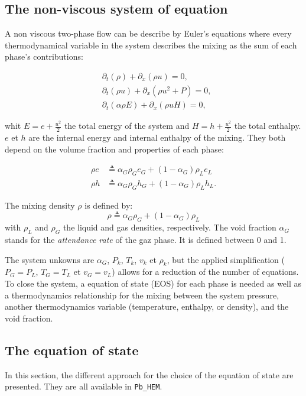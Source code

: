 \subsection{The non-viscous system of equation}
\label{sec:non-viscous-system}



A non viscous two-phase flow can be describe by Euler's equations
where every thermodynamical variable in the system describes the
mixing as the sum of each phase's contributions:

\begin{align}
&\partial_t (\rho) +\partial_x (\rho u) = 0, \nonumber\\
&\partial_t (\rho u) +\partial_x (\rho u^2 + P) = 0, \nonumber\\
&\partial_t (\alpha\rho E) +\partial_x (\rho uH) = 0,  \nonumber
\label{sistema1}
\end{align}

whit $E=e+\frac{u^2}{2}$ the total energy of the system and
$H=h+\frac{u^2}{2}$ the total enthalpy. $e$ et $h$ are the internal
energy and internal enthalpy of the mixing. They both depend on the
volume fraction and properties of each phase:

\begin{align}
\rho e&\triangleq\alpha_G \rho_G e_G + (1 -\alpha_G)\rho_L e_L \\
\rho h&\triangleq\alpha_G \rho_G h_G + (1 -\alpha_G)\rho_L h_L.
\end{align}

The mixing density $\rho$ is defined by:
\begin{equation}
\rho \triangleq \alpha_G\rho_G+(1-\alpha_G)\rho_L
\end{equation}
with $\rho_L$ and $\rho_G$ the liquid and gas densities, respectively.
The void fraction $\alpha_G$ stands for the \emph{attendance rate} of
the gaz phase. It is defined between 0 and 1.


The system unkowns are $\alpha_G$, $P_k$, $T_k$, $v_k$ et $\rho_k$,
but the applied simplification ($P_G=P_L$, $T_G=T_L$ et $v_G=v_L$) allows for a reduction of the number of
equations. To close the system, a equation of state (EOS) for each
phase is needed as well as a thermodynamics relationship for the
mixing between the system pressure, another thermodynamics variable
(temperature, enthalpy, or density), and the void fraction.

\subsection{The equation of state}
In this section, the different approach for the choice of the equation
of state are presented. They are all available in \texttt{Pb\_HEM}.

